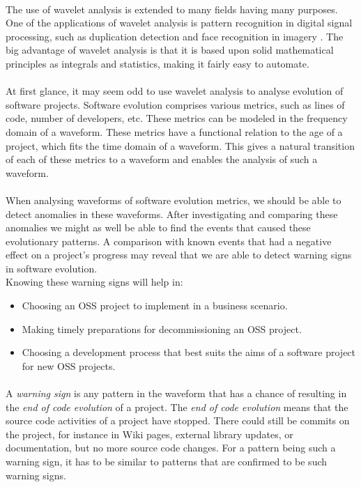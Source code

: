 \paragraph{}
The use of wavelet analysis is extended to many fields having many purposes.
One of the applications of wavelet analysis is pattern recognition in digital
signal processing, such as duplication detection and face recognition in
imagery \cite{myna, wadkar}. The big advantage of wavelet analysis is that
it is based upon solid mathematical principles as integrals and statistics,
making it fairly easy to automate.

\paragraph{}
At first glance, it may seem odd to use wavelet analysis to analyse evolution of
software projects. Software evolution comprises various metrics, such as lines
of code, number of developers, etc. These metrics can be modeled in the
frequency domain of a waveform. These metrics have a functional relation to the
age of a project, which fits the time domain of a waveform. This gives a
natural transition of each of these metrics to a waveform and enables the
analysis of such a waveform.

\paragraph{}
When analysing waveforms of software evolution metrics, we should be able to
detect anomalies in these waveforms. After investigating and comparing these
anomalies we might as well be able to find the events that caused these
evolutionary patterns. A comparison with known events that had a negative
effect on a project's progress may reveal that we are able to detect warning
signs in software evolution.\\

\noindent
Knowing these warning signs will help in:
\begin{itemize}
	\item Choosing an OSS project to implement in a business scenario.
	\item Making timely preparations for decommissioning an OSS project.
	\item Choosing a development process that best suits the aims of a software
	project for new OSS projects.
\end{itemize}

\paragraph{}
A \emph{warning sign }\rm is any pattern in the waveform that has a chance of
resulting in the \emph{end of code evolution }\rm of a project. The \emph{end of
code evolution }\rm means that the source code activities of a project have
stopped. There could still be commits on the project, for instance in Wiki
pages, external library updates, or documentation, but no more source code
changes. For a pattern being such a warning sign, it has to be similar to
patterns that are confirmed to be such warning signs.



